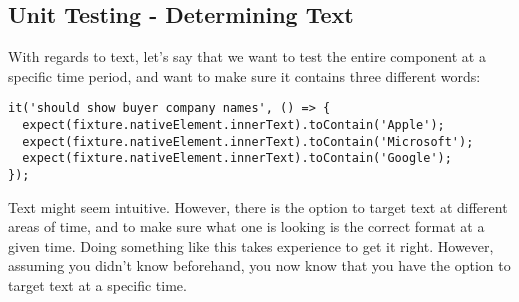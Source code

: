 \subsection{ Unit Testing - Determining Text }
With regards to text, let's say that we want to test the entire component at a
specific time period, and want to make sure it contains three different words:
\begin{lstlisting}
it('should show buyer company names', () => {
  expect(fixture.nativeElement.innerText).toContain('Apple');
  expect(fixture.nativeElement.innerText).toContain('Microsoft');
  expect(fixture.nativeElement.innerText).toContain('Google');
});
\end{lstlisting}

Text might seem intuitive. However, there is the option to target text at
different areas of time, and to make sure what one is looking is the correct
format at a given time. Doing something like this takes experience to get it
right. However, assuming you didn't know beforehand, you now know that you have
the option to target text at a specific time.

